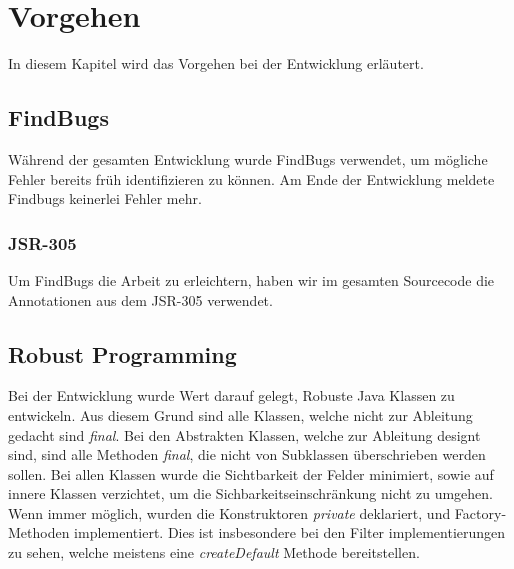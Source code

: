 \section{Vorgehen}

In diesem Kapitel wird das Vorgehen bei der Entwicklung erläutert.

\subsection{FindBugs}

Während der gesamten Entwicklung wurde FindBugs verwendet, um mögliche Fehler bereits 
früh identifizieren zu können. Am Ende der Entwicklung meldete Findbugs keinerlei Fehler mehr.

\subsubsection{JSR-305}

Um FindBugs die Arbeit zu erleichtern, haben wir im gesamten Sourcecode die Annotationen aus dem JSR-305 
verwendet.

\subsection{Robust Programming}

Bei der Entwicklung wurde Wert darauf gelegt, Robuste Java Klassen zu entwickeln. Aus diesem Grund 
sind alle Klassen, welche nicht zur Ableitung gedacht sind \textit{final}. Bei den Abstrakten Klassen,
welche zur Ableitung designt sind, sind alle Methoden \textit{final}, die nicht von Subklassen überschrieben
werden sollen. Bei allen Klassen wurde die Sichtbarkeit der Felder minimiert, sowie auf innere Klassen 
verzichtet, um die Sichbarkeitseinschränkung nicht zu umgehen. Wenn immer möglich, wurden die 
Konstruktoren \textit{private} deklariert, und Factory-Methoden implementiert. Dies ist insbesondere
bei den Filter implementierungen zu sehen, welche meistens eine \textit{createDefault} Methode 
bereitstellen.
